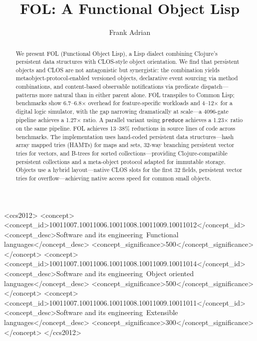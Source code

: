 \documentclass[sigconf,nonacm,review]{acmart}
\begin{document}
\title{FOL: A Functional Object Lisp}

\author{Frank Adrian}

\begin{abstract}
We present FOL (Functional Object Lisp), a Lisp dialect combining Clojure's persistent data structures with CLOS-style object orientation. We find that persistent objects and CLOS are not antagonistic but synergistic: the combination yields metaobject-protocol-enabled versioned objects, declarative event sourcing via method combinations, and content-based observable notifications via predicate dispatch---patterns more natural than in either parent alone. FOL transpiles to Common Lisp; benchmarks show 6.7--6.8$\times$ overhead for feature-specific workloads and 4--12$\times$ for a digital logic simulator, with the gap narrowing dramatically at scale---a 4096-gate pipeline achieves a 1.27$\times$ ratio. A parallel variant using \texttt{preduce} achieves a 1.23$\times$ ratio on the same pipeline. FOL achieves 13--38\% reductions in source lines of code across benchmarks. The implementation uses hand-coded persistent data structures---hash array mapped tries (HAMTs) for maps and sets, 32-way branching persistent vector tries for vectors, and B-trees for sorted collections---providing Clojure-compatible persistent collections and a meta-object protocol adapted for immutable storage. Objects use a hybrid layout---native CLOS slots for the first 32 fields, persistent vector tries for overflow---achieving native access speed for common small objects.
\end{abstract}

\begin{CCSXML}
<ccs2012>
   <concept>
       <concept_id>10011007.10011006.10011008.10011009.10011012</concept_id>
       <concept_desc>Software and its engineering~Functional languages</concept_desc>
       <concept_significance>500</concept_significance>
   </concept>
   <concept>
       <concept_id>10011007.10011006.10011008.10011009.10011014</concept_id>
       <concept_desc>Software and its engineering~Object oriented languages</concept_desc>
       <concept_significance>500</concept_significance>
   </concept>
   <concept>
       <concept_id>10011007.10011006.10011008.10011009.10011011</concept_id>
       <concept_desc>Software and its engineering~Extensible languages</concept_desc>
       <concept_significance>300</concept_significance>
   </concept>
</ccs2012>
\end{CCSXML}
\end{document}
